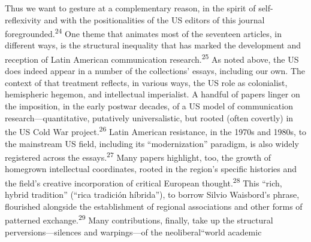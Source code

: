 \documentclass{tufte-handout}
\begin{document}
Thus we want to gesture at a complementary reason, in the spirit of
self-reflexivity and with the positionalities of the US editors of this
journal foregrounded.\textsuperscript{24} One theme that animates most of the seventeen
articles, in different ways, is the structural inequality that has
marked the development and reception of Latin American communication
research.\textsuperscript{25}
As noted above, the US does indeed appear in a number of the
collections' essays, including our own. The context of that treatment
reflects, in various ways, the US role as colonialist, hemispheric
hegemon, and intellectual imperialist. A handful of papers linger on the
imposition, in the early postwar decades, of a US model of communication
research---quantitative, putatively universalistic, but rooted (often
covertly) in the US Cold War project.\textsuperscript{26} Latin American resistance, in
the 1970s and 1980s, to the mainstream US field, including its
``modernization'' paradigm, is also widely registered across the
essays.\textsuperscript{27} Many papers highlight, too, the
growth of homegrown intellectual coordinates, rooted in the region's
specific histories and the field's creative incorporation of critical
European thought.\textsuperscript{28} This ``rich, hybrid tradition'' (``rica
tradición híbrida''), to borrow Silvio Waisbord's phrase, flourished
alongside the establishment of regional associations and other forms of
patterned exchange.\textsuperscript{29}
Many contributions, finally, take up the structural
perversions---silences and warpings---of the neoliberal\newpage\noindent ``world academic
\end{document}
